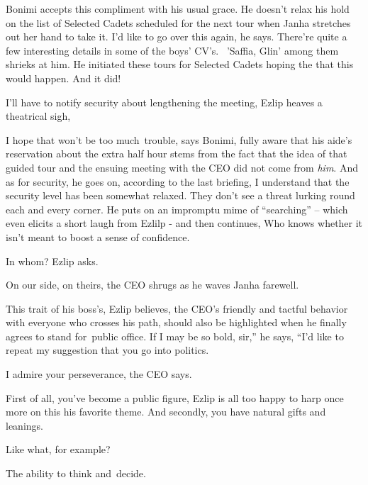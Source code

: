 \documentclass[12pt]{book}
\begin{document}
Bonimi accepts this compliment with his usual grace. He doesn't relax his hold on the list of Selected
Cadets{ }scheduled for the next tour when Janha stretches out her hand to take it. {\textquotedbl}I'd
like to go over this again,{\textquotedbl} he says. {\textquotedbl}There're quite a few interesting details in some of
the boys' CV's.{\textquotedbl} \ {}'Saffia, Glin' among them shrieks at him. He initiated these tours for Selected
Cadets hoping the that this would happen. And{ }it did!~~

{\textquotedbl} I'll have to notify security about lengthening the meeting,{\textquotedbl} Ezlip heaves a theatrical
sigh,

{\textquotedbl}I hope that won't be too much~trouble,{\textquotedbl} says Bonimi, fully aware that his aide's
reservation about the extra half hour stems from the fact that the idea of that guided tour and the{
}ensuing meeting with the CEO did not come from \textit{him}. {\textquotedbl}And as for security,{\textquotedbl} he
goes on, {\textquotedbl}according to the last briefing, I understand that the security level has been somewhat relaxed.
They don't see a threat lurking round each and every corner.{\textquotedbl} He puts on an impromptu mime of
``searching'' -- which even elicits a short laugh from Ezlilp - and then continues, {\textquotedbl}Who knows whether it
isn't meant to boost a sense of confidence.{\textquotedbl}

{\textquotedbl}In whom?{\textquotedbl} Ezlip asks.

{\textquotedbl}On our side, on theirs,{\textquotedbl} the CEO shrugs as he waves Janha farewell.

This trait of his boss's, Ezlip believes,{ }the CEO's friendly and tactful
behavior with everyone who crosses his path, should also be highlighted when he finally agrees to stand for~public
office. {\textquotedbl}If I may be so bold, sir,'' he says, ``I'd like to repeat my suggestion that you go into
politics.{\textquotedbl}

{\textquotedbl}I admire your perseverance,{\textquotedbl} the CEO says.

{\textquotedbl}First of all, you've become a public figure,{\textquotedbl} Ezlip is all too happy to harp once more on
this his favorite theme. {\textquotedbl}And secondly, you have natural gifts and leanings.{\textquotedbl}

{\textquotedbl}Like what, for example?{\textquotedbl}

{\textquotedbl}The ability to think and~decide.{\textquotedbl}
\end{document}
